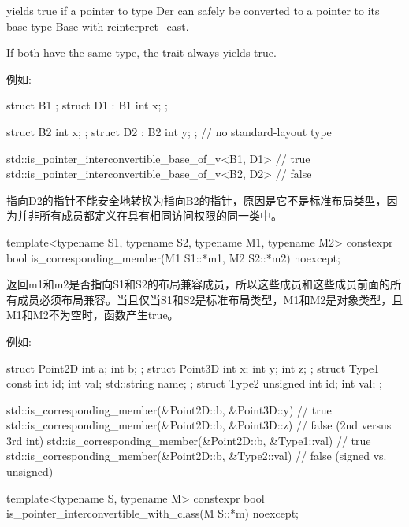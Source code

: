 

yields true if a pointer to type Der can safely be converted to a pointer to its base type Base with reinterpret\_cast.

If both have the same type, the trait always yields true.

例如:

\begin{cpp}
struct B1 { };
struct D1 : B1 { int x; };

struct B2 { int x; };
struct D2 : B2 { int y; }; // no standard-layout type

std::is_pointer_interconvertible_base_of_v<B1, D1> // true
std::is_pointer_interconvertible_base_of_v<B2, D2> // false
\end{cpp}

指向D2的指针不能安全地转换为指向B2的指针，原因是它不是标准布局类型，因为并非所有成员都定义在具有相同访问权限的同一类中。


\begin{cpp}
template<typename S1, typename S2, typename M1, typename M2>
constexpr bool is_corresponding_member(M1 S1::*m1, M2 S2::*m2) noexcept;
\end{cpp}

返回m1和m2是否指向S1和S2的布局兼容成员，所以这些成员和这些成员前面的所有成员必须布局兼容。当且仅当S1和S2是标准布局类型，M1和M2是对象类型，且M1和M2不为空时，函数产生true。

例如:

\begin{cpp}
struct Point2D { int a; int b; };
struct Point3D { int x; int y; int z; };
struct Type1 { const int id; int val; std::string name; };
struct Type2 { unsigned int id; int val; };

std::is_corresponding_member(&Point2D::b, &Point3D::y) // true
std::is_corresponding_member(&Point2D::b, &Point3D::z) // false (2nd versus 3rd int)
std::is_corresponding_member(&Point2D::b, &Type1::val) // true
std::is_corresponding_member(&Point2D::b, &Type2::val) // false (signed vs. unsigned)
\end{cpp}


\begin{cpp}
template<typename S, typename M>
constexpr bool is_pointer_interconvertible_with_class(M S::*m) noexcept;
\end{cpp}

